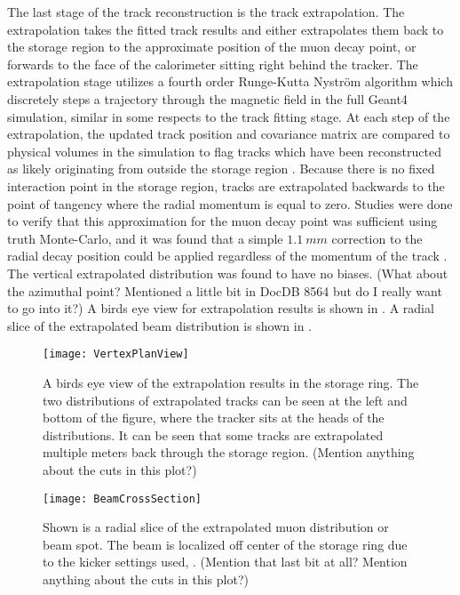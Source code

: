 The last stage of the track reconstruction is the track extrapolation. The extrapolation takes the fitted track results and either extrapolates them back to the storage region to the approximate position of the muon decay point, or forwards to the face of the calorimeter sitting right behind the tracker. The extrapolation stage utilizes a fourth order Runge-Kutta Nystr\"{o}m algorithm \cite{SCThesis} which discretely steps a trajectory through the magnetic field in the full \gmtwo Geant4 simulation, similar in some respects to the track fitting stage. At each step of the extrapolation, the updated track position and covariance matrix are compared to physical volumes in the simulation to flag tracks which have been reconstructed as likely originating from outside the storage region \cite{SCThesis,extrapolationerrors}. Because there is no fixed interaction point in the storage region, tracks are extrapolated backwards to the point of tangency where the radial momentum is equal to zero. Studies were done to verify that this approximation for the muon decay point was sufficient using truth Monte-Carlo, and it was found that a simple $\SI{1.1}{mm}$ correction to the radial decay position could be applied regardless of the momentum of the track \cite{SCThesis}. The vertical extrapolated distribution was found to have no biases. (What about the azimuthal point? Mentioned a little bit in DocDB 8564 but do I really want to go into it?) A birds eye view for extrapolation results is shown in . A radial slice of the extrapolated beam distribution is shown in .


\begin{figure}[]
    \centering
    \texttt{[image: VertexPlanView]}
    \caption[Birds eye view of extrapolation in ring]{A birds eye view of the extrapolation results in the storage ring. The two distributions of extrapolated tracks can be seen at the left and bottom of the figure, where the tracker sits at the heads of the distributions. It can be seen that some tracks are extrapolated multiple meters back through the storage region. (Mention anything about the cuts in this plot?)}    
    \label{fig:VertexPlanView}
\end{figure}

\begin{figure}[]
  \centering
  \texttt{[image: BeamCrossSection]}
    \caption[Extrapolated muon beam distribution cross-section]{Shown is a radial slice of the extrapolated muon distribution or beam spot. The beam is localized off center of the storage ring due to the kicker settings used, . (Mention that last bit at all? Mention anything about the cuts in this plot?)}
    \label{fig:BeamCrossSection}
\end{figure}








